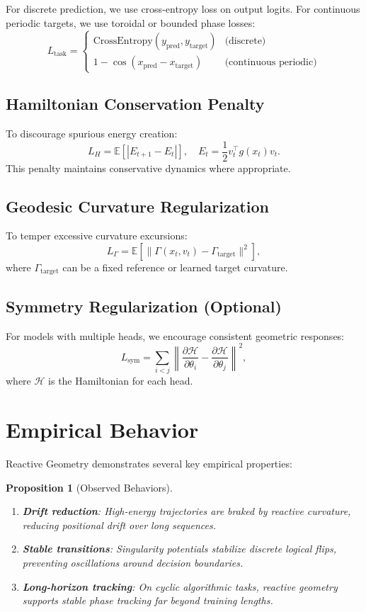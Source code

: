 \documentclass[12pt,letterpaper,twoside]{article}
\newtheorem{prop}{Proposition}[section]
\newcommand{\ham}{\mathcal{H}}
\begin{document}
For discrete prediction, we use cross-entropy loss on output logits. For continuous periodic targets, we use toroidal or bounded phase losses:
\[
L_{\text{task}} = 
\begin{cases}
\text{CrossEntropy}(y_{\text{pred}}, y_{\text{target}}) & \text{(discrete)} \\
1 - \cos(x_{\text{pred}} - x_{\text{target}}) & \text{(continuous periodic)}
\end{cases}
\]

\subsection{Hamiltonian Conservation Penalty}

To discourage spurious energy creation:
\[
L_H = \mathbb{E}\left[|E_{t+1} - E_t|\right], \quad E_t = \frac{1}{2}v_t^\top g(x_t) v_t.
\]
This penalty maintains conservative dynamics where appropriate.

\subsection{Geodesic Curvature Regularization}

To temper excessive curvature excursions:
\[
L_\Gamma = \mathbb{E}\left[\|\Gamma(x_t, v_t) - \Gamma_{\text{target}}\|^2\right],
\]
where $\Gamma_{\text{target}}$ can be a fixed reference or learned target curvature.

\subsection{Symmetry Regularization (Optional)}

For models with multiple heads, we encourage consistent geometric responses:
\[
L_{\text{sym}} = \sum_{i < j} \left\|\frac{\partial \ham}{\partial \theta_i} - \frac{\partial \ham}{\partial \theta_j}\right\|^2,
\]
where $\ham$ is the Hamiltonian for each head.

\section{Empirical Behavior}

Reactive Geometry demonstrates several key empirical properties:

\begin{prop}[Observed Behaviors]
\begin{enumerate}
\item \textbf{Drift reduction}: High-energy trajectories are braked by reactive curvature, reducing positional drift over long sequences.
\item \textbf{Stable transitions}: Singularity potentials stabilize discrete logical flips, preventing oscillations around decision boundaries.
\item \textbf{Long-horizon tracking}: On cyclic algorithmic tasks, reactive geometry supports stable phase tracking far beyond training lengths.
\end{enumerate}
\end{prop}
\end{document}
